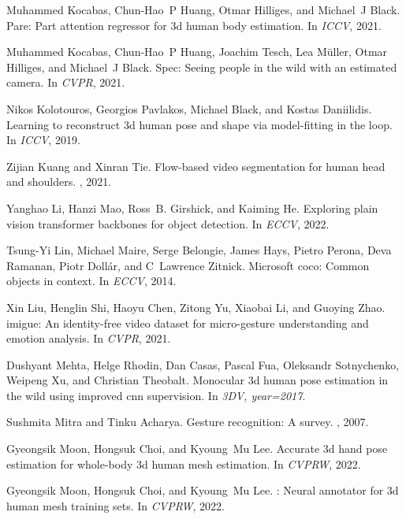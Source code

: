 \documentclass[10pt,twocolumn,letterpaper]{article}
\begin{document}
\begin{thebibliography}{10}
Muhammed Kocabas, Chun-Hao~P Huang, Otmar Hilliges, and Michael~J Black.
\newblock Pare: Part attention regressor for 3d human body estimation.
\newblock In {\em ICCV}, 2021.

Muhammed Kocabas, Chun-Hao~P Huang, Joachim Tesch, Lea M{\"u}ller, Otmar
  Hilliges, and Michael~J Black.
\newblock Spec: Seeing people in the wild with an estimated camera.
\newblock In {\em CVPR}, 2021.

Nikos Kolotouros, Georgios Pavlakos, Michael Black, and Kostas Daniilidis.
\newblock Learning to reconstruct 3d human pose and shape via model-fitting in
  the loop.
\newblock In {\em ICCV}, 2019.

Zijian Kuang and Xinran Tie.
\newblock Flow-based video segmentation for human head and shoulders.
, 2021.

Yanghao Li, Hanzi Mao, Ross~B. Girshick, and Kaiming He.
\newblock Exploring plain vision transformer backbones for object detection.
\newblock In {\em ECCV}, 2022.

Tsung-Yi Lin, Michael Maire, Serge Belongie, James Hays, Pietro Perona, Deva
  Ramanan, Piotr Doll{\'a}r, and C~Lawrence Zitnick.
\newblock Microsoft coco: Common objects in context.
\newblock In {\em ECCV}, 2014.

Xin Liu, Henglin Shi, Haoyu Chen, Zitong Yu, Xiaobai Li, and Guoying Zhao.
\newblock imigue: An identity-free video dataset for micro-gesture
  understanding and emotion analysis.
\newblock In {\em CVPR}, 2021.

Dushyant Mehta, Helge Rhodin, Dan Casas, Pascal Fua, Oleksandr Sotnychenko,
  Weipeng Xu, and Christian Theobalt.
\newblock Monocular 3d human pose estimation in the wild using improved cnn
  supervision.
\newblock In {\em 3DV, year={2017}}.

Sushmita Mitra and Tinku Acharya.
\newblock Gesture recognition: A survey.
, 2007.

Gyeongsik Moon, Hongsuk Choi, and Kyoung~Mu Lee.
\newblock Accurate 3d hand pose estimation for whole-body 3d human mesh
  estimation.
\newblock In {\em CVPRW}, 2022.

Gyeongsik Moon, Hongsuk Choi, and Kyoung~Mu Lee.
: Neural annotator for 3d human mesh training sets.
\newblock In {\em CVPRW}, 2022.


\end{thebibliography}
\end{document}
